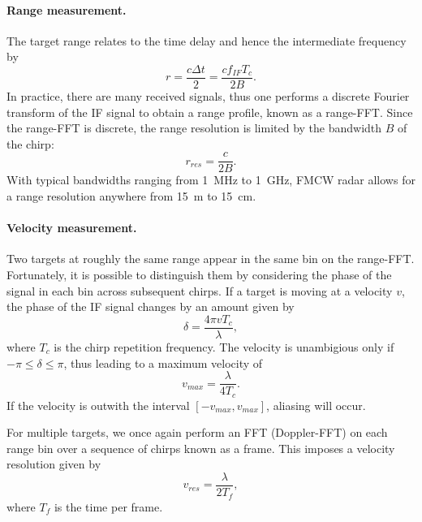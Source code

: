 \documentclass{article}
\begin{document}
\paragraph{Range measurement.} The target range relates to the time delay and hence the intermediate frequency by
\begin{equation}
	r = \frac{c \Delta t}{2} = \frac{c f_{IF} T_c}{2 B}.
\end{equation}
In practice, there are many received signals, thus one performs a discrete Fourier transform of the IF signal to obtain a range profile, known as a range-FFT. Since the range-FFT is discrete, the range resolution is limited by the bandwidth \(B\) of the chirp:
\begin{equation}
	r_{res} = \frac{c}{2B}.
\end{equation}
With typical bandwidths ranging from \SI{1}{\mega\hertz} to \SI{1}{\giga\hertz}, FMCW radar allows for a range resolution anywhere from \SI{15}{\metre} to \SI{15}{\centi\metre}.

\paragraph{Velocity measurement.} Two targets at roughly the same range appear in the same bin on the range-FFT. Fortunately, it is possible to distinguish them by considering the phase of the signal in each bin across subsequent chirps. If a target is moving at a velocity \(v\), the phase of the IF signal changes by an amount given by
\begin{equation}
	\delta = \frac{4 \pi v T_c}{\lambda},
\end{equation}
where \(T_c\) is the chirp repetition frequency. The velocity is unambigious only if \(-\pi \le \delta \le \pi\), thus leading to a maximum velocity of
\begin{equation}
	v_{max} = \frac{\lambda}{4 T_c}.
\end{equation}
If the velocity is outwith the interval \([-v_{max}, v_{max}]\), aliasing will occur.

For multiple targets, we once again perform an FFT (Doppler-FFT) on each range bin over a sequence of chirps known as a frame. This imposes a velocity resolution given by
\begin{equation}
	v_{res} = \frac{\lambda}{2 T_f},
\end{equation}
where \(T_f\) is the time per frame.
\end{document}
